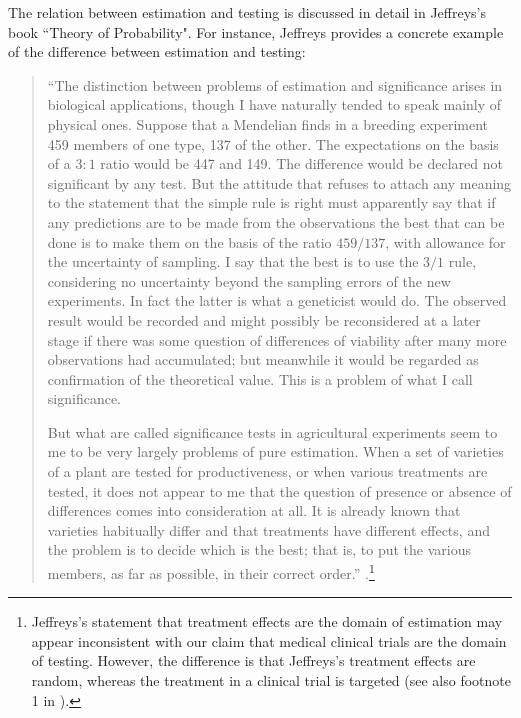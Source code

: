 The relation between estimation and testing is discussed in detail in Jeffreys's book ``Theory of Probability". For instance, Jeffreys provides a concrete example of the difference between estimation and testing:
\begin{quotation}
``The distinction between problems of estimation and significance arises in biological applications, though I have naturally tended to speak mainly of physical ones. Suppose that a Mendelian finds in a breeding experiment 459 members of one type, 137 of the other. The expectations on the basis of a $3:1$ ratio would be 447 and 149. The difference would be declared not significant by any test. But the attitude that refuses to attach any meaning to the statement that the simple rule is right must apparently say that if any predictions are to be made from the observations the best that can be done is to make them on the basis of the ratio $459/137$, with allowance for the uncertainty of sampling. I say that the best is to use the $3/1$ rule, considering no uncertainty beyond the sampling errors of the new experiments. In fact the latter is what a geneticist would do. The observed result would be recorded and might possibly be reconsidered at a later stage if there was some question of differences of viability after many more observations had accumulated; but meanwhile it would be regarded as confirmation of the theoretical value. This is a problem of what I call significance.

But what are called significance tests in agricultural experiments seem to me to be very largely problems of pure estimation. When a set of varieties of a plant are tested for productiveness, or when various treatments are tested, it does not appear to me that the question of presence or absence of differences comes into consideration at all. It is already known that varieties habitually differ and that treatments have different effects, and the problem is to decide which is the best; that is, to put the various members, as far as possible, in their correct order.'' \cite[p. 389]{Jeffreys1961}.\footnote{Jeffreys's statement that treatment effects are the domain of estimation may appear inconsistent with our claim that medical clinical trials are the domain of testing. However, the difference is that Jeffreys's treatment effects are random, whereas the treatment in a clinical trial is targeted (see also footnote 1 in ).}
\end{quotation}

